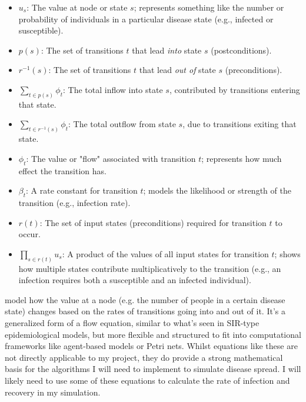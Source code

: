 \begin{center}
    \begin{itemize}
        \item \textbf{\( u_s \)}: The value at node or state \( s \); represents something like the number or probability of individuals in a particular disease state (e.g., infected or susceptible).

        \item \textbf{\( p(s) \)}: The set of transitions \( t \) that lead \emph{into} state \( s \) (postconditions).

        \item \textbf{\( r^{-1}(s) \)}: The set of transitions \( t \) that lead \emph{out of} state \( s \) (preconditions).

        \item \textbf{\( \sum_{t \in p(s)} \phi_t \)}: The total inflow into state \( s \), contributed by transitions entering that state.

        \item \textbf{\( \sum_{t \in r^{-1}(s)} \phi_t \)}: The total outflow from state \( s \), due to transitions exiting that state.

        \item \textbf{\( \phi_t \)}: The value or "flow" associated with transition \( t \); represents how much effect the transition has.

        \item \textbf{\( \beta_t \)}: A rate constant for transition \( t \); models the likelihood or strength of the transition (e.g., infection rate).

        \item \textbf{\( r(t) \)}: The set of input states (preconditions) required for transition \( t \) to occur.

        \item \textbf{\( \prod_{s \in r(t)} u_s \)}: A product of the values of all input states for transition \( t \); shows how multiple states contribute multiplicatively to the transition (e.g., an infection requires both a susceptible and an infected individual).
    \end{itemize}
\end{center}
model how the value at a node (e.g. the number of people in a certain disease state) changes based on the rates of transitions going into and out of it. It's a generalized form of a flow equation, similar to what's seen in SIR-type epidemiological models, but more flexible and structured to fit into computational frameworks like agent-based models or Petri nets. Whilst equations like these are not directly applicable to my project, they do provide a strong mathematical basis for the algorithms I will need to implement to simulate disease spread. I will likely need to use some of these equations to calculate the rate of infection and recovery in my simulation.


